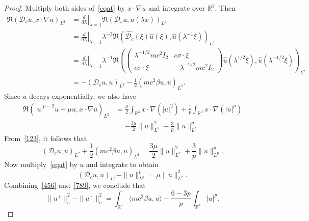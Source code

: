 \documentclass{amsart}
\theoremstyle{plain}
\theoremstyle{definition}
\theoremstyle{remark}
\numberwithin{equation}{section} \numberwithin{figure}{section}
\begin{document}
  \begin{proof}
      Multiply both sides of~\eqref{eqat} by \( x \cdot \nabla u \) and integrate over \( \mathbb{R}^3 \). Then
      \begin{equation}\label{123}
          \begin{split}
              \Re(\mathscr{D}_c u, x \cdot \nabla u)_{L^2}
              &= \left. \frac{d}{d\lambda} \right|_{\lambda=1} \Re(\mathscr{D}_c u, u(\lambda x))_{L^2} \\
              &= \left. \frac{d}{d\lambda} \right|_{\lambda=1} \lambda^{-3} \Re \left( \widehat{\mathscr{D}_c}(\xi) \hat{u}(\xi), \hat{u}(\lambda^{-1} \xi) \right)_{L^2} \\
              &= \left. \frac{d}{d\lambda} \right|_{\lambda=1} \lambda^{-1} \Re \left( 
                  \begin{pmatrix}
                      \lambda^{-1/2} m c^2 I_2 & c \sigma \cdot \xi \\
                      c \sigma \cdot \xi & -\lambda^{-1/2} m c^2 I_2
                  \end{pmatrix}
                  \hat{u}(\lambda^{1/2} \xi), \hat{u}(\lambda^{-1/2} \xi) \right)_{L^2} \\
              &= - (\mathscr{D}_c u, u)_{L^2} - \frac{1}{2} (m c^2 \beta u, u)_{L^2}.
          \end{split}
      \end{equation}  
      Since \( u \) decays exponentially, we also have
      \begin{equation}\label{234}
          \begin{split}
              \Re(|u|^{p-2}u + \mu u, x \cdot \nabla u)_{L^2}
              &= \frac{\mu}{2} \int_{\mathbb{R}^3} x \cdot \nabla(|u|^2) + \frac{1}{p} \int_{\mathbb{R}^3} x \cdot \nabla(|u|^p) \\
              &= -\frac{3\mu}{2} \|u\|_{L^2}^2 - \frac{3}{p} \|u\|_{L^p}^p.
          \end{split}
      \end{equation}  
      From~\eqref{123}, it follows that
      \begin{equation}\label{789}
          (\mathscr{D}_c u, u)_{L^2} + \frac{1}{2} (m c^2 \beta u, u)_{L^2} = \frac{3\mu}{2} \|u\|_{L^2}^2 + \frac{3}{p} \|u\|_{L^p}^p.
      \end{equation}  
      Now multiply~\eqref{eqat} by \( u \) and integrate to obtain
      \begin{equation}\label{456}
          (\mathscr{D}_c u, u)_{L^2} - \|u\|_{L^p}^p = \mu \|u\|_{L^2}^2.
      \end{equation}  
      Combining~\eqref{456} and~\eqref{789}, we conclude that
      \begin{equation*}
          \|u^+\|_c^2 - \|u^-\|_c^2 = \int_{\mathbb{R}^3} \langle m c^2 \beta u, u \rangle - \frac{6 - 3p}{p} \int_{\mathbb{R}^3} |u|^p.
      \end{equation*}
  \end{proof}
  
\end{document}
